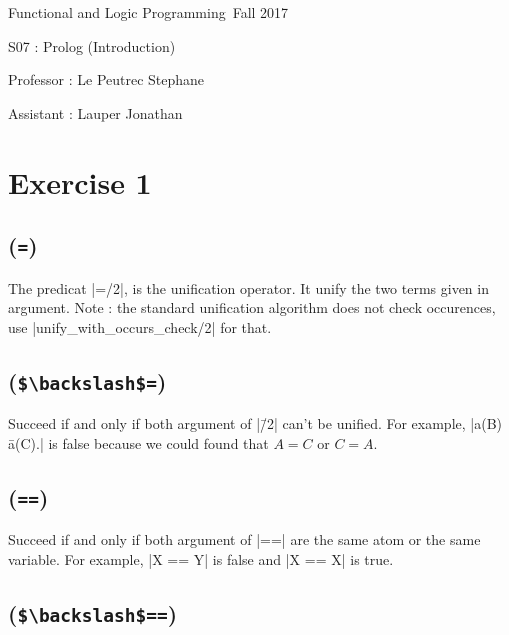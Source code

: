 \documentclass[a4paper,11pt]{report}
\author{Sylvain Julmy}
\date{\today}
\begin{document}
\begin{center}
  \Large{
    Functional and Logic Programming\
    Fall 2017
  }
  
  \noindent\makebox[\linewidth]{\rule{\linewidth}{0.4pt}}
  S07 : Prolog (Introduction)
  \noindent\makebox[\linewidth]{\rule{\linewidth}{0.4pt}}

  \begin{flushleft}
    Professor : Le Peutrec Stephane
    
    Assistant : Lauper Jonathan
  \end{flushleft}

  \noindent\makebox[\linewidth]{\rule{\textwidth}{1pt}}
\end{center}

\section*{Exercise 1}

\subsection*{(\protect\Verb+=+)}

The predicat \prologinline|=/2|, is the unification operator. It unify the two
terms given in argument. Note : the standard unification algorithm does not
check occurences, use \prologinline|unify_with_occurs_check/2| for that.

\subsection*{(\protect\Verb+$\backslash$=+)}

Succeed if and only if both argument of \prologinline|\=/2| can't be unified.
For example, \prologinline|a(B) \= a(C).| is false because we could found that
$A=C$ or $C=A$.

\subsection*{(\protect\Verb+==+)}

Succeed if and only if both argument of \prologinline|==| are the same atom or
the same variable. For example, \prologinline|X == Y| is false and
\prologinline|X == X| is true.

\subsection*{(\protect\Verb+$\backslash$==+)}
\end{document}
